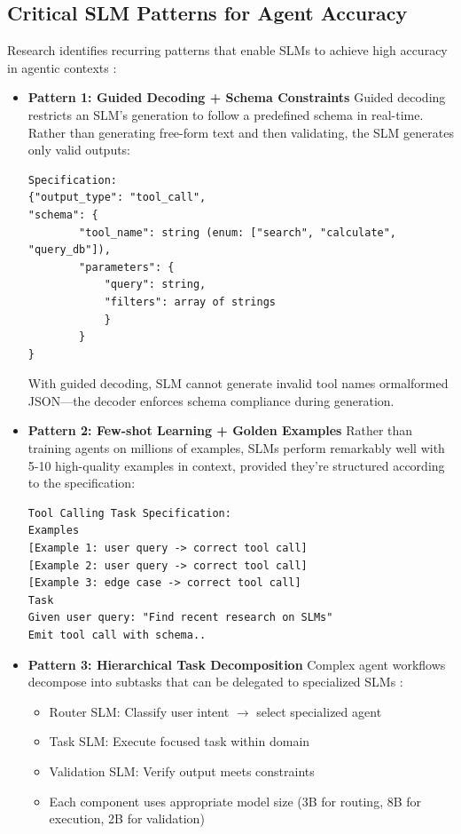 \documentclass[11pt,a4paper]{article}
\begin{document}
\subsection{Critical SLM Patterns for Agent Accuracy}
Research identifies recurring patterns that enable SLMs to achieve high accuracy in agentic contexts \cite{nvidia2025}:
\begin{itemize}
\item \textbf{Pattern 1: Guided Decoding + Schema Constraints} \newline
Guided decoding restricts an SLM's generation to follow a predefined schema in real-time\cite{nvidia2025}. Rather than generating free-form text and then validating, the SLM generates only valid outputs:
\begin{lstlisting}
Specification:
{"output_type": "tool_call",
"schema": {
        "tool_name": string (enum: ["search", "calculate", "query_db"]),
        "parameters": {
            "query": string,
            "filters": array of strings
            }
        }
}
\end{lstlisting}
With guided decoding, SLM cannot generate invalid tool names ormalformed JSON—the decoder enforces schema compliance during generation.

\item \textbf{Pattern 2: Few-shot Learning + Golden Examples} \newline
Rather than training agents on millions of examples, SLMs perform remarkably well with 5-10 high-quality examples in context, provided they're structured according to the specification\cite{nvidia2025}:
\begin{lstlisting}
Tool Calling Task Specification:
Examples
[Example 1: user query -> correct tool call]
[Example 2: user query -> correct tool call]
[Example 3: edge case -> correct tool call]
Task
Given user query: "Find recent research on SLMs"
Emit tool call with schema..
\end{lstlisting}
\item \textbf{Pattern 3: Hierarchical Task Decomposition} \newline
Complex agent workflows decompose into subtasks that can be delegated to specialized SLMs \cite{nvidia2025}:
\begin{itemize}
    \item Router SLM: Classify user intent $\rightarrow$ select specialized agent
    \item Task SLM: Execute focused task within domain
    \item Validation SLM: Verify output meets constraints
    \item Each component uses appropriate model size (3B for routing, 8B for execution, 2B for validation)
\end{itemize}


\end{itemize}
\end{document}
